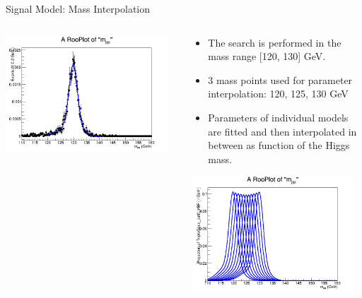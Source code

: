 \documentclass[pdf, 9pt]{beamer}
\begin{document}
\begin{frame}[c]{Signal Model: Mass Interpolation}
\begin{columns}[T]
\begin{column}{0.4\textwidth}
\begin{center}
          \includegraphics[width=0.95\textwidth, height=0.3\textheight]{figs/higgs/signalmodel/bdt/bdt_110to160_withSys/signalFit__c0__130__GluGlu__TripleGaus__default.png}
        \end{center}
      \end{column}
      \begin{column}{0.6\textwidth}
        \begin{center}
          \begin{itemize}
            \item \tiny{The search is performed in the mass range [120, 130] GeV.}
            \item \tiny{3 mass points used for parameter interpolation: 120, 125, 130 GeV}
            \item \tiny{Parameters of individual models are fitted and then interpolated in between as function of the Higgs mass.}
          \end{itemize}
          \vspace{0.5cm}
          \includegraphics[width=0.95\textwidth, height=0.65\textheight]{figs/higgs/signalmodel/bdt/bdt_110to160_withSys/signalFitInterpolationWithSpline__c0__VBF__TripleGaus__.png}
        \end{center}
      \end{column}
    \end{columns}
  \end{frame}
\end{document}

